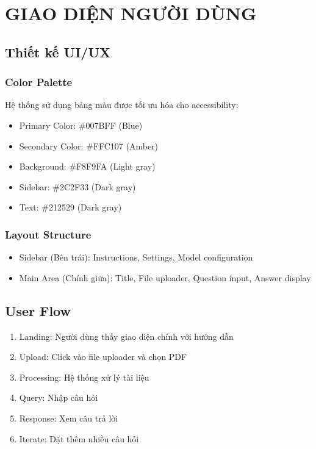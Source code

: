 \documentclass[12pt,a4paper]{report}
\begin{document}
\newpage

\chapter{GIAO DIỆN NGƯỜI DÙNG}

\section{Thiết kế UI/UX}

\subsection{Color Palette}
Hệ thống sử dụng bảng màu được tối ưu hóa cho accessibility:
\begin{itemize}
    \item Primary Color: \#007BFF (Blue)
    \item Secondary Color: \#FFC107 (Amber)
    \item Background: \#F8F9FA (Light gray)
    \item Sidebar: \#2C2F33 (Dark gray)
    \item Text: \#212529 (Dark gray)
\end{itemize}

\subsection{Layout Structure}
\begin{itemize}
    \item Sidebar (Bên trái): Instructions, Settings, Model configuration
    \item Main Area (Chính giữa): Title, File uploader, Question input, Answer display
\end{itemize}

\section{User Flow}
\begin{enumerate}
    \item Landing: Người dùng thấy giao diện chính với hướng dẫn
    \item Upload: Click vào file uploader và chọn PDF
    \item Processing: Hệ thống xử lý tài liệu
    \item Query: Nhập câu hỏi
    \item Response: Xem câu trả lời
    \item Iterate: Đặt thêm nhiều câu hỏi
\end{enumerate}
\end{document}
